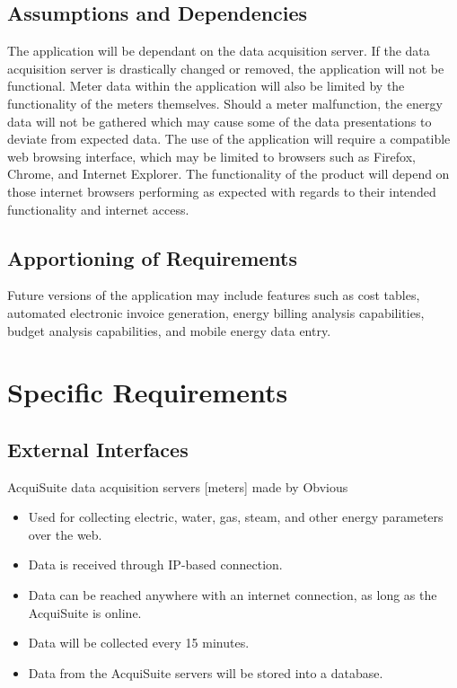 \documentclass[journal,10pt,onecolumn,compsoc]{IEEEtran}
\begin{document}
    \subsection{Assumptions and Dependencies}
    The application will be dependant on the data acquisition server. If the data acquisition server is drastically changed or removed, the application will not be functional. Meter data within the application will also be limited by the functionality of the meters themselves. Should a meter malfunction, the energy data will not be gathered which may cause some of the data presentations to deviate from expected data. The use of the application will require a compatible web browsing interface, which may be limited to browsers such as Firefox, Chrome, and Internet Explorer. The functionality of the product will depend on those internet browsers performing as expected with regards to their intended functionality and internet access. 

    \subsection{Apportioning of Requirements}
    Future versions of the application may include features such as cost tables, automated electronic invoice generation, energy billing analysis capabilities, budget analysis capabilities, and mobile energy data entry.
    
    \section{Specific Requirements}
    
    \subsection{External Interfaces}
    AcquiSuite data acquisition servers [meters] made by Obvious
    \begin{itemize}
        \item Used for collecting electric, water, gas, steam, and other energy parameters over the web.
        \item Data is received through IP-based connection.
        \item Data can be reached anywhere with an internet connection, as long as the AcquiSuite is online.
        \item Data will be collected every 15 minutes.
        \item Data from the AcquiSuite servers will be stored into a database.
    \end{itemize}
\end{document}
